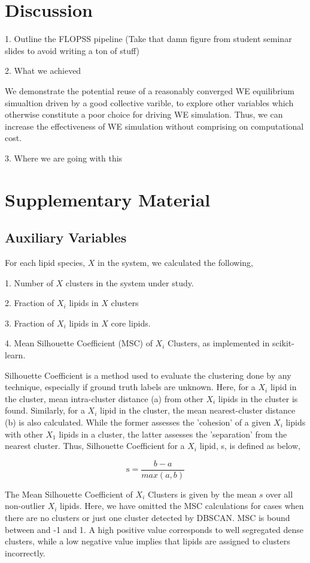 \documentclass{biophys-new}
\begin{document}
\section*{Discussion}

1. Outline the FLOPSS pipeline (Take that damn figure from student seminar slides to avoid writing a ton of stuff)

2. What we achieved

We demonstrate the potential reuse of a reasonably converged WE equilibrium simualtion driven by a good collective varible, to explore other variables which otherwise constitute a poor choice for driving WE simulation.
Thus, we can increase the effectiveness of WE simulation without comprising on computational cost.

3. Where we are going with this






\section*{Supplementary Material}

\subsection*{Auxiliary Variables}

For each lipid species, $X$ in the system, we calculated the following, 

1. Number of $X$ clusters in the system under study.

2. Fraction of $X_i$ lipids in $X$ clusters

3. Fraction of $X_i$ lipids in $X$ core lipids.

4. Mean Silhouette Coefficient (MSC) of $X_i$ Clusters, as implemented in scikit-learn.

Silhouette Coefficient is a method used to evaluate the clustering done by any technique, especially if ground truth labels are unknown. 
Here, for a $X_i$ lipid in the cluster, mean intra-cluster distance (a) from other $X_i$ lipids in the cluster is found.  
Similarly, for a $X_i$ lipid in the cluster, the mean nearest-cluster distance (b) is also calculated.
While the former assesses the 'cohesion' of a given $X_i$ lipids with other $X_1$ lipids in a cluster, the latter assesses the 'separation' from the nearest cluster.
Thus, Silhouette Coefficient for a $X_i$ lipid, s, is defined as below,

\begin{equation}
\label{eq:SC}
\text{s} = \frac{b - a}{max(a,b)}
\end{equation}

The Mean Silhouette Coefficient of $X_i$ Clusters is given by the mean $s$ over all non-outlier $X_i$ lipids.
Here, we have omitted the MSC calculations for cases when there are no clusters or just one cluster detected by DBSCAN. 
MSC is bound between and -1 and 1.
A high positive value corresponds to well segregated dense clusters, while a low negative value implies that lipids are assigned to clusters incorrectly.  
\end{document}
